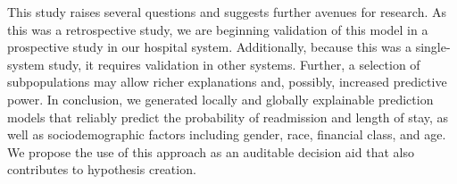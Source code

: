 This study raises several questions and suggests further avenues for research.\@
As this was a retrospective study, we are beginning validation of this model
in a prospective study in our hospital system.\@
Additionally, because this was a single-system study, it requires validation in other systems.\@
Further, a selection of subpopulations may allow richer explanations and, 
possibly, increased predictive power.\supercite{Yu2015, Smith2018, Weinreich2016, Garrison2017, Golas2018}
In conclusion, we generated locally and globally explainable prediction models 
that reliably predict the probability of readmission and length of stay,
as well as sociodemographic factors including gender, race, financial class, and age.\@
We propose the use of this approach as an auditable decision aid that 
also contributes to hypothesis creation.\@






